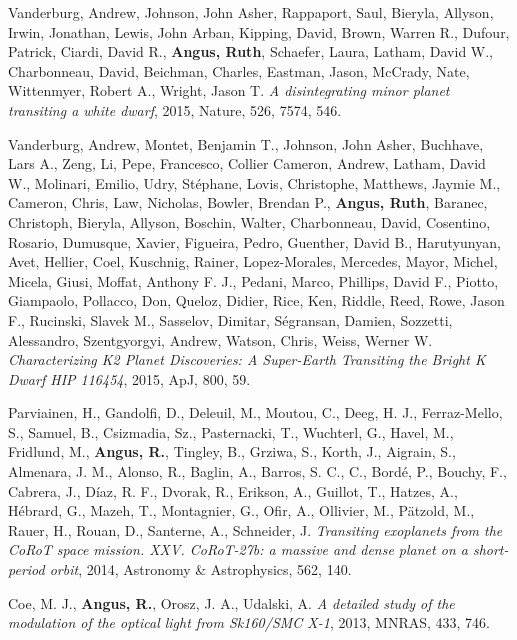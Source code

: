 \documentclass[12pt,letterpaper]{article}
\begin{document}
\begin{list}{}{\cvlist}
\item
Vanderburg, Andrew, Johnson, John Asher, Rappaport, Saul, Bieryla, Allyson,
    Irwin, Jonathan, Lewis, John Arban, Kipping, David, Brown, Warren R.,
    Dufour, Patrick, Ciardi, David R., {\bf Angus, Ruth}, Schaefer, Laura,
    Latham, David W., Charbonneau, David, Beichman, Charles, Eastman, Jason,
    McCrady, Nate, Wittenmyer, Robert A., Wright, Jason T.
    {\it A disintegrating minor planet transiting a white dwarf}, 2015,
    Nature, 526, 7574, 546.
\item
Vanderburg, Andrew, Montet, Benjamin T., Johnson, John Asher, Buchhave, Lars
    A., Zeng, Li, Pepe, Francesco, Collier Cameron, Andrew, Latham, David W.,
    Molinari, Emilio, Udry, Stéphane, Lovis, Christophe, Matthews, Jaymie M.,
    Cameron, Chris, Law, Nicholas, Bowler, Brendan P., {\bf Angus, Ruth},
    Baranec, Christoph, Bieryla, Allyson, Boschin, Walter, Charbonneau, David,
    Cosentino, Rosario, Dumusque, Xavier, Figueira, Pedro, Guenther, David B.,
    Harutyunyan, Avet, Hellier, Coel, Kuschnig, Rainer, Lopez-Morales,
    Mercedes, Mayor, Michel, Micela, Giusi, Moffat, Anthony F. J., Pedani,
    Marco, Phillips, David F., Piotto, Giampaolo, Pollacco, Don, Queloz,
    Didier, Rice, Ken, Riddle, Reed, Rowe, Jason F., Rucinski, Slavek M.,
    Sasselov, Dimitar, Ségransan, Damien, Sozzetti, Alessandro, Szentgyorgyi,
    Andrew, Watson, Chris, Weiss, Werner W.
    {\it Characterizing K2 Planet Discoveries: A Super-Earth Transiting the
    Bright K Dwarf HIP 116454}, 2015, ApJ, 800, 59.
\item
Parviainen, H., Gandolfi, D., Deleuil, M., Moutou, C., Deeg, H. J.,
    Ferraz-Mello, S., Samuel, B., Csizmadia, Sz., Pasternacki, T., Wuchterl,
    G., Havel, M., Fridlund, M., {\bf Angus, R.}, Tingley, B., Grziwa, S.,
    Korth, J., Aigrain, S., Almenara, J. M., Alonso, R., Baglin, A., Barros,
    S. C., C., Bordé, P., Bouchy, F., Cabrera, J., Díaz, R. F., Dvorak, R.,
    Erikson, A., Guillot, T., Hatzes, A., Hébrard, G., Mazeh, T., Montagnier,
    G., Ofir, A., Ollivier, M., Pätzold, M., Rauer, H., Rouan, D., Santerne,
    A., Schneider, J.
    {\it Transiting exoplanets from the CoRoT space mission. XXV. CoRoT-27b: a
    massive and dense planet on a short-period orbit}, 2014, Astronomy \&
    Astrophysics, 562, 140.
\item
    Coe, M. J., {\bf Angus, R.}, Orosz, J. A., Udalski, A. {\it A detailed
    study of the modulation of the optical light from Sk160/SMC X-1}, 2013,
    MNRAS, 433, 746.
\end{list}
\end{document}
